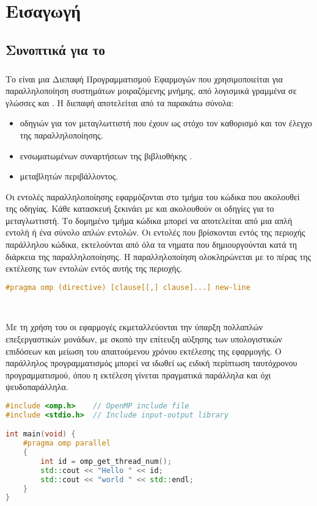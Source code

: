 \section{Εισαγωγή}
\subsection{Συνοπτικά για το }
\subparagraph{}
Το  είναι μια Διεπαφή Προγραμματισμού Εφαρμογών  που χρησιμοποιείται για παραλληλοποίηση συστημάτων μοιραζόμενης μνήμης, από λογισμικά γραμμένα σε γλώσσες  και . Η διεπαφή αποτελείται από τα παρακάτω σύνολα\cite{thenextstep20}:
\begin{itemize}
    \item οδηγιών για τον μεταγλωττιστή που έχουν ως στόχο τον καθορισμό και τον έλεγχο της παραλληλοποίησης.
    \item ενσωματωμένων συναρτήσεων της βιβλιοθήκης .
    \item μεταβλητών περιβάλλοντος.
\end{itemize}

Οι εντολές παραλληλοποίησης εφαρμόζονται στο τμήμα του κώδικα που ακολουθεί της οδηγίας. Κάθε κατασκευή ξεκινάει με \emph{} και ακολουθούν οι οδηγίες για το μεταγλωττιστή. Το δομημένο τμήμα κώδικα μπορεί να αποτελείται από μια απλή εντολή ή ένα σύνολο απλών εντολών\cite{ompsyntaxrefguide}. Οι εντολές που βρίσκονται εντός της περιοχής παράλληλου κώδικα, εκτελούνται από όλα τα νηματα που δημιουργούνται κατά τη διάρκεια της παραλληλοποίησης. Η παραλληλοποίηση ολοκληρώνεται με το πέρας της εκτέλεσης των εντολών εντός αυτής της περιοχής.
\ \\
\begin{lstlisting}[language=C++, caption={\el{Γραμματική σύνταξης οδηγίας} OpenMP}, frame = single, xleftmargin=.1\textwidth]
#pragma omp (directive) [clause[[,] clause]...] new-line
\end{lstlisting} 
\ \\
\par
Με τη χρήση του \emph{} οι εφαρμογές εκμεταλλεύονται την ύπαρξη πολλαπλών επεξεργαστικών μονάδων, με σκοπό την επίτευξη αύξησης των υπολογιστικών επιδόσεων και μείωση του απαιτούμενου χρόνου εκτέλεσης της εφαρμογής. Ο παράλληλος προγραμματισμός μπορεί να ιδωθεί ως ειδική περίπτωση ταυτόχρονου προγραμματισμού, όπου η εκτέλεση γίνεται πραγματικά παράλληλα και όχι ψευδοπαράλληλα\cite{googleparallelprog}.
\ \\
\begin{lstlisting}[language=C++, caption={\el{Παράδειγμα παράλληλου κώδικα} OpenMP}, frame=tb]
#include <omp.h>    // OpenMP include file
#include <stdio.h>  // Include input-output library

int main(void) {
	#pragma omp parallel	
	{
		int id = omp_get_thread_num();
		std::cout << "Hello " << id;
		std::cout << "world " << std::endl;
	}
}
\end{lstlisting}

